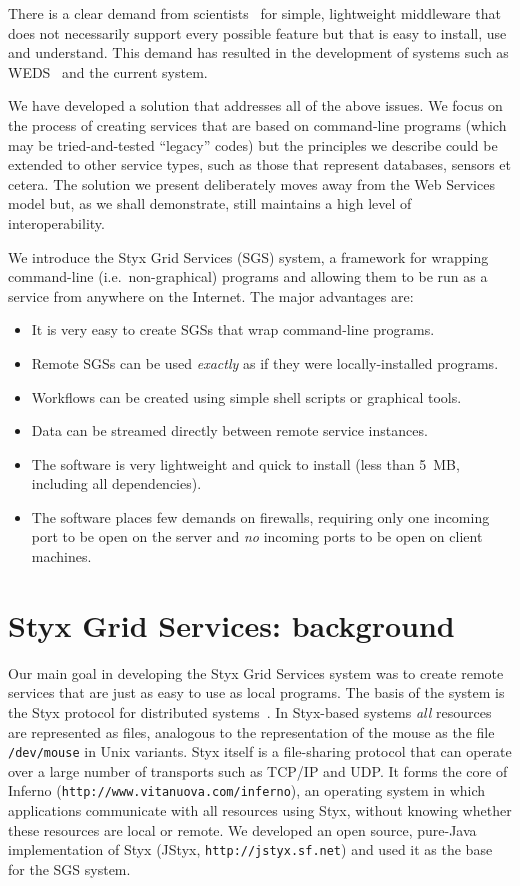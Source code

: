 \documentclass{llncs}
\begin{document}
There is a clear demand from scientists~\cite{chin:2004} for simple, lightweight middleware that does not necessarily support every possible feature but that is easy to install, use and understand.  This demand has resulted in the development of systems such as WEDS~\cite{weds} and the current system.

We have developed a solution that addresses all of the above issues.  We focus on the process of creating services that are based on command-line programs (which may be tried-and-tested ``legacy'' codes) but the principles we describe could be extended to other service types, such as those that represent databases, sensors et cetera.  The solution we present deliberately moves away from the Web Services model but, as we shall demonstrate, still maintains a high level of interoperability.

We introduce the Styx Grid Services (SGS) system, a framework for wrapping command-line (i.e.\ non-graphical) programs and allowing them to be run as a service from anywhere on the Internet.  The major advantages are:
\begin{itemize}
  \item It is very easy to create SGSs that wrap command-line programs.
	\item Remote SGSs can be used {\em exactly\/} as if they were locally-installed programs.
	\item Workflows can be created using simple shell scripts or graphical tools.
	\item Data can be streamed directly between remote service instances.
	\item The software is very lightweight and quick to install (less than 5~MB, including all dependencies).
	\item The software places few demands on firewalls, requiring only one incoming port to be open on the server and {\em no\/} incoming ports to be open on client machines.
\end{itemize}


\section{Styx Grid Services: background}\label{sec:sgsoverview}
Our main goal in developing the Styx Grid Services system was to create remote services that are just as easy to use as local programs.  The basis of the system is the Styx protocol for distributed systems~\cite{Pike:1999}.  In Styx-based systems {\em all\/} resources
are represented as files, analogous to the representation of the mouse as the file {\tt /dev/mouse} in Unix variants.  Styx itself is a file-sharing protocol that can operate over a large number of transports such as TCP/IP and UDP.  It forms the core of Inferno ({\tt http://www.vitanuova.com/inferno}), an operating system in which applications communicate with all resources using Styx, without knowing whether these resources are local or remote.  We developed an open source, pure-Java implementation of Styx (JStyx, {\tt http://jstyx.sf.net}) and used it as the base for the SGS system.
\end{document}
